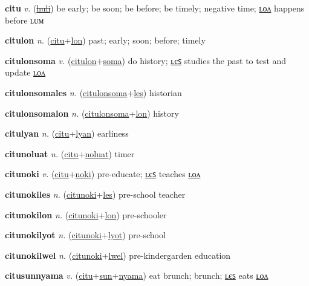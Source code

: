 \textbf{\hypertarget{citu}{citu}} \textit{v.} (\hyperlink{huli}{\sout{huli}})
be early; be soon; be before; be timely; negative time; \hyperlink{citulon}{ʟᴏᴧ} happens before ʟᴜᴍ

\textbf{\hypertarget{citulon}{citulon}} \textit{n.} (\hyperlink{citu}{citu}+\allowbreak \hyperlink{lon}{lon})
past; early; soon; before; timely

\textbf{\hypertarget{citulonsoma}{citulonsoma}} \textit{v.} (\hyperlink{citulon}{citulon}+\allowbreak \hyperlink{soma}{soma})
do history; \hyperlink{citulonsomales}{ʟєꜱ} studies the past to test and update \hyperlink{citulonsomalon}{ʟᴏᴧ}

\textbf{\hypertarget{citulonsomales}{citulonsomales}} \textit{n.} (\hyperlink{citulonsoma}{citulonsoma}+\allowbreak \hyperlink{les}{les})
historian

\textbf{\hypertarget{citulonsomalon}{citulonsomalon}} \textit{n.} (\hyperlink{citulonsoma}{citulonsoma}+\allowbreak \hyperlink{lon}{lon})
history

\textbf{\hypertarget{citulyan}{citulyan}} \textit{n.} (\hyperlink{citu}{citu}+\allowbreak \hyperlink{lyan}{lyan})
earliness

\textbf{\hypertarget{citunoluat}{citunoluat}} \textit{n.} (\hyperlink{citu}{citu}+\allowbreak \hyperlink{noluat}{noluat})
timer

\textbf{\hypertarget{citunoki}{citunoki}} \textit{v.} (\hyperlink{citu}{citu}+\allowbreak \hyperlink{noki}{noki})
pre-educate; \hyperlink{citunokiles}{ʟєꜱ} teaches \hyperlink{citunokilon}{ʟᴏᴧ}

\textbf{\hypertarget{citunokiles}{citunokiles}} \textit{n.} (\hyperlink{citunoki}{citunoki}+\allowbreak \hyperlink{les}{les})
pre-school teacher

\textbf{\hypertarget{citunokilon}{citunokilon}} \textit{n.} (\hyperlink{citunoki}{citunoki}+\allowbreak \hyperlink{lon}{lon})
pre-schooler

\textbf{\hypertarget{citunokilyot}{citunokilyot}} \textit{n.} (\hyperlink{citunoki}{citunoki}+\allowbreak \hyperlink{lyot}{lyot})
pre-school

\textbf{\hypertarget{citunokilwel}{citunokilwel}} \textit{n.} (\hyperlink{citunoki}{citunoki}+\allowbreak \hyperlink{lwel}{lwel})
pre-kindergarden education

\textbf{\hypertarget{citusunnyama}{citusunnyama}} \textit{v.} (\hyperlink{citu}{citu}+\allowbreak \hyperlink{sun}{sun}+\allowbreak \hyperlink{nyama}{nyama})
eat brunch; brunch; \hyperlink{citusunnyamales}{ʟєꜱ} eats \hyperlink{citusunnyamalon}{ʟᴏᴧ}

